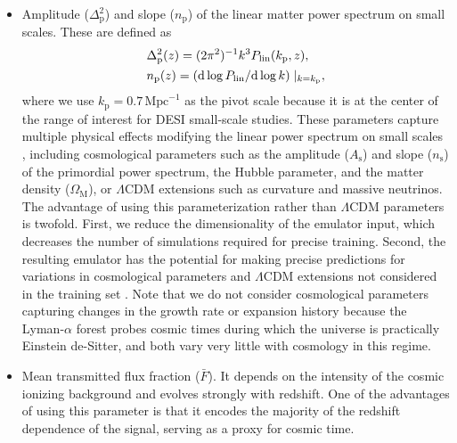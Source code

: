 \documentclass{aa}
\newcommand{\lyaf}{Lyman-$\alpha$ forest\xspace}
\newcommand{\mflux}{\ensuremath{\bar{F}}\xspace}
\begin{document}
\begin{itemize}
    \item Amplitude ($\Delta^2_\mathrm{p}$) and slope ($n_\mathrm{p}$) of the linear matter power spectrum on small scales. These are defined as
    \begin{align}
        \label{eq:amplitude}
        & \Delta_\mathrm{p}^2(z) = (2\pi^2)^{-1} k^3 P_{\rm lin} (k_\mathrm{p}, z),\\
        \label{eq:slope}
        & n_\mathrm{p}(z) = \left(\mathrm{d}\log P_{\rm lin} / \mathrm{d}\log k\right)\mid_{k = k_\mathrm{p}},
    \end{align}
    where we use $k_\mathrm{p} = 0.7\,\mathrm{Mpc}^{-1}$ as the pivot scale because it is at the center of the range of interest for DESI small-scale studies. These parameters capture multiple physical effects modifying the linear power spectrum on small scales \citep[see][for a detailed discussion]{Pedersen2021}, including cosmological parameters such as the amplitude ($A_\mathrm{s}$) and slope ($n_\mathrm{s}$) of the primordial power spectrum, the Hubble parameter, and the matter density ($\Omega_\mathrm{M}$), or $\Lambda$CDM extensions such as curvature and massive neutrinos. The advantage of using this parameterization rather than $\Lambda$CDM parameters is twofold. First, we reduce the dimensionality of the emulator input, which decreases the number of simulations required for precise training. Second, the resulting emulator has the potential for making precise predictions for variations in cosmological parameters and $\Lambda$CDM extensions not considered in the training set \citep[][]{Pedersen2021, pedersen2023CompressingCosmologicalInformation, cabayol-garcia2023NeuralNetworkEmulator}. Note that we do not consider cosmological parameters capturing changes in the growth rate or expansion history because the \lyaf probes cosmic times during which the universe is practically Einstein de-Sitter, and both vary very little with cosmology in this regime.

    \item Mean transmitted flux fraction (\mflux). It depends on the intensity of the cosmic ionizing background and evolves strongly with redshift. One of the advantages of using this parameter is that it encodes the majority of the redshift dependence of the signal, serving as a proxy for cosmic time.


\end{itemize}
\end{document}
